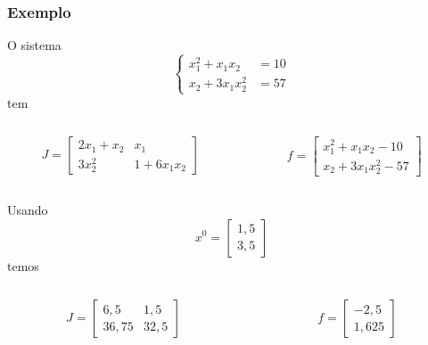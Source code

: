\begin{frame}
\frametitle{Exemplo}
O sistema
\[
\begin{cases}
x_1^2 + x_1x_2 &= 10 \\
x_2 + 3x_1x_2^2 &= 57
\end{cases}
\]
tem

\begin{columns}[T]
\begin{column}{0.45\textwidth}
\[
J=
\begin{bmatrix}
2x_1 + x_2 & x_1 \\
3x_2^2 & 1 + 6x_1x_2 
\end{bmatrix}
\]
\end{column}

\begin{column}{0.45\textwidth}

\[
f=
\begin{bmatrix}
x_1^2 + x_1x_2 - 10 \\
x_2 + 3x_1x_2^2 - 57
\end{bmatrix}
\]
\end{column}
\end{columns}

Usando 
\[
x^0=
\begin{bmatrix}
1,5 \\ 3,5
\end{bmatrix}
\]
temos

\begin{columns}
\begin{column}{0.45\textwidth}
\[
J=
\begin{bmatrix}
6,5 & 1,5 \\
36,75 & 32,5 
\end{bmatrix}
\]
\end{column}

\begin{column}{0.45\textwidth}
\[
f=
\begin{bmatrix}
-2,5 \\
1,625
\end{bmatrix}
\]
\end{column}
\end{columns}
\end{frame}

